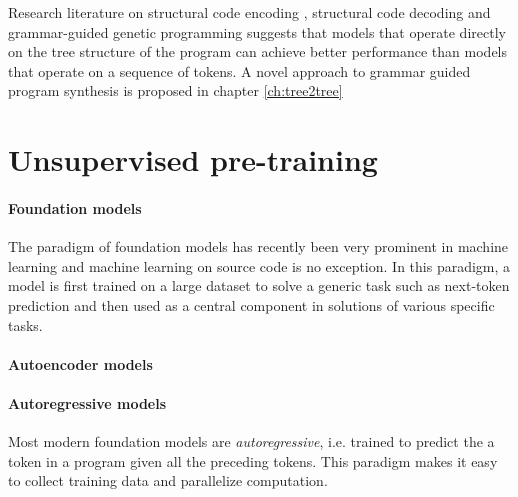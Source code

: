Research literature on structural code encoding \cite{alon2019structural,zhang2015tree}, structural code decoding \cite{jiang2021ast,zhu2019grammarcnn} and grammar-guided genetic programming \cite{bunelLeveragingGrammarReinforcement2018, manriqueGrammarguidedGeneticProgramming2009, sobaniaChallengesProgramSynthesis2020a} suggests that models that operate directly on the tree structure of the program can achieve better performance than models that operate on a sequence of tokens.
A novel approach to grammar guided program synthesis is proposed in chapter \ref{ch:tree2tree}

\newpage
\section{Unsupervised pre-training}
\label{sec:pretrain}

\paragraph{Foundation models}

The paradigm of foundation models \cite{foundation-models} has recently been very prominent in machine learning and machine learning on source code is no exception.
In this paradigm, a model is first trained on a large dataset to solve a generic task such as next-token prediction and then used as a central component in solutions of various specific tasks.

\paragraph{Autoencoder models}







\paragraph{Autoregressive models}

Most modern foundation models are \emph{autoregressive}, i.e. trained to predict the a token in a program given all the preceding tokens.
This paradigm makes it easy to collect training data and parallelize computation.


